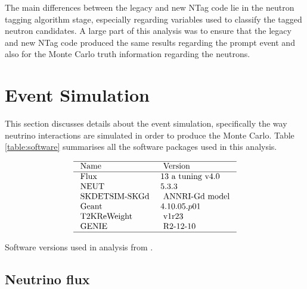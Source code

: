 The main differences between the legacy and new NTag code lie in the neutron tagging algorithm stage, especially regarding variables used to classify the tagged neutron candidates. A large part of this analysis was to ensure that the legacy and new NTag code produced the same results regarding the prompt event and also for the Monte Carlo truth information regarding the neutrons. 



\section{Event Simulation}

This section discusses details about the event simulation, specifically the way neutrino interactions are simulated in order to produce the Monte Carlo. Table \ref{table:software} summarises all the software packages used in this analysis. 


\begin{table}
$$
\begin{array}{ll}
\hline \text { Name } & \text { Version } \\
\hline \text { Flux } & 13 \text { a tuning v4.0 } \\
\text { NEUT } & 5.3 .3 \\
\text { SKDETSIM-SKGd } & \text { ANNRI-Gd model } \\
\text { Geant } & 4.10.05.p01 \\
\text { T2KReWeight } & \text { v1r23 } \\
\text { GENIE } & \text { R2-12-10 } \\
\hline
\end{array}
$$
\caption{Software versions used in analysis from \cite{tn415_fiacob}.}
\label{table:software}
\end{table}

\subsection{Neutrino flux}

